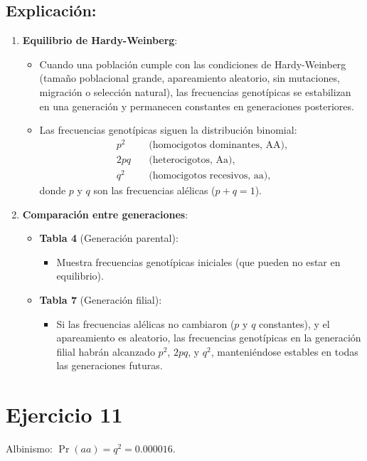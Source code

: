 \documentclass{article}
\begin{document}
	\subsection*{Explicación:}
	\begin{enumerate}
		\item \textbf{Equilibrio de Hardy-Weinberg}:
		\begin{itemize}
			\item Cuando una población cumple con las condiciones de Hardy-Weinberg (tamaño poblacional grande, apareamiento aleatorio, sin mutaciones, migración o selección natural), las frecuencias genotípicas se estabilizan en una generación y permanecen constantes en generaciones posteriores.
			\item Las frecuencias genotípicas siguen la distribución binomial:
			\begin{align*}
				p^2 & \quad \text{(homocigotos dominantes, AA)}, \\
				2pq & \quad \text{(heterocigotos, Aa)}, \\
				q^2 & \quad \text{(homocigotos recesivos, aa)},
			\end{align*}
			donde \( p \) y \( q \) son las frecuencias alélicas (\( p + q = 1 \)).
		\end{itemize}
		
		\item \textbf{Comparación entre generaciones}:
		\begin{itemize}
			\item \textbf{Tabla 4} (Generación parental): 
			\begin{itemize}
				\item Muestra frecuencias genotípicas iniciales (que pueden no estar en equilibrio).
			\end{itemize}
			\item \textbf{Tabla 7} (Generación filial):
			\begin{itemize}
				\item Si las frecuencias alélicas no cambiaron (\( p \) y \( q \) constantes), y el apareamiento es aleatorio, las frecuencias genotípicas en la generación filial habrán alcanzado \( p^2 \), \( 2pq \), y \( q^2 \), manteniéndose estables en todas las generaciones futuras.
			\end{itemize}
		\end{itemize}
	\end{enumerate}
	

	\section*{Ejercicio 11}
	Albinismo: \( \Pr(aa) = q^2 = 0.000016 \).
	
\end{document}
